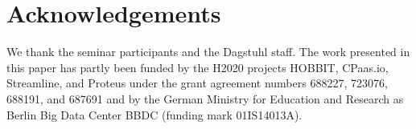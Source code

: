 \section*{Acknowledgements}
We thank the seminar participants and the Dagstuhl staff.
The work presented in this paper has partly been funded by the H2020 projects HOBBIT, CPaas.io, Streamline, and Proteus under the grant agreement numbers 688227, 723076, 688191, and 687691 and by the German Ministry for Education and Research as Berlin Big Data Center BBDC (funding mark 01IS14013A).
